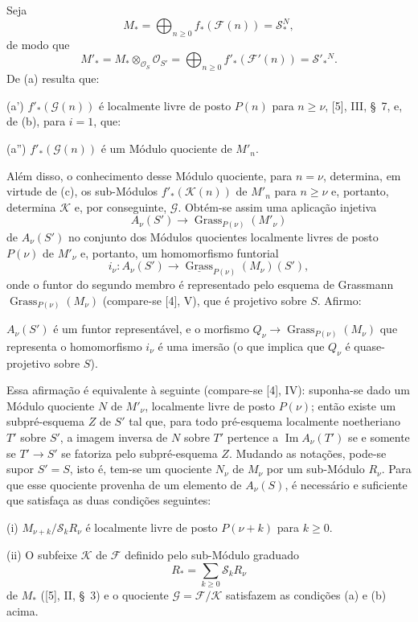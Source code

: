 Seja
\[
M_* =\bigoplus_{n\geq0}f_*(\mathcal F(n))=\mathcal S_*^{N},
\]
de modo que
\[
M'_* =M_*\otimes_{\mathcal O_S}\mathcal O_{S'}
=\bigoplus_{n\geq0}f'_*(\mathcal F'(n))=\mathcal S'_*{}^{N}.
\]
De (a) resulta que:

\noindent (a') $f'_*(\mathcal G(n))$ é localmente livre de posto $P(n)$ para
$n\geq\nu$, [5], III, \S~7, e, de (b), para $i=1$, que:

\noindent (a'') $f'_*(\mathcal G(n))$ é um Módulo quociente de $M'_n$.

Além disso, o conhecimento desse Módulo quociente, para $n=\nu$, determina,
em virtude de (c), os sub-Módulos $f'_*(\mathcal K(n))$ de $M'_n$ para
$n\geq\nu$ e, portanto, determina $\mathcal K$ e, por conseguinte, $\mathcal G$.
Obtém-se assim uma aplicação injetiva
\[
A_\nu(S')\longrightarrow\operatorname{Grass}_{P(\nu)}(M'_\nu)
\]
de $A_\nu(S')$ no conjunto dos Módulos quocientes localmente livres de posto
$P(\nu)$ de $M'_\nu$ e, portanto, um homomorfismo funtorial
\[
i_\nu:A_\nu(S')\longrightarrow
\underline{\operatorname{Grass}}_{P(\nu)}(M_\nu)(S'),
\]
onde o funtor do segundo membro é representado pelo esquema de Grassmann
$\operatorname{Grass}_{P(\nu)}(M_\nu)$ (compare-se [4], V), que é projetivo
sobre $S$. Afirmo:

 $A_\nu(S')$ é um funtor representável, e o morfismo
$Q_\nu\longrightarrow\operatorname{Grass}_{P(\nu)}(M_\nu)$ que representa o
homomorfismo $i_\nu$ é uma imersão (o que implica que $Q_\nu$ é
quase-projetivo sobre $S$).

Essa afirmação é equivalente à seguinte (compare-se [4], IV): suponha-se dado
um Módulo quociente $N$ de $M'_\nu$, localmente livre de posto $P(\nu)$; então
existe um subpré-esquema $Z$ de $S'$ tal que, para todo pré-esquema localmente
noetheriano $T'$
sobre $S'$, a imagem inversa de $N$ sobre $T'$ pertence a
$\operatorname{Im}A_\nu(T')$ se e somente se $T'\longrightarrow S'$ se
fatoriza pelo subpré-esquema $Z$. Mudando as notações, pode-se supor $S'=S$,
isto é, tem-se um quociente $N_\nu$ de $M_\nu$ por um sub-Módulo $R_\nu$.
Para que esse quociente provenha de um elemento de $A_\nu(S)$, é necessário e
suficiente que satisfaça as duas condições seguintes:

\medskip
\noindent (i) $M_{\nu+k}/\mathcal S_kR_\nu$ é localmente livre de posto
$P(\nu+k)$ para $k\geq0$.

\smallskip
\noindent (ii) O subfeixe $\mathcal K$ de $\mathcal F$ definido pelo
sub-Módulo graduado
\[
R_* =\sum_{k\geq0}\mathcal S_kR_\nu
\]
de $M_*$ ([5], II, \S~3) e o quociente $\mathcal G=\mathcal F/\mathcal K$
satisfazem as condições (a) e (b) acima.


